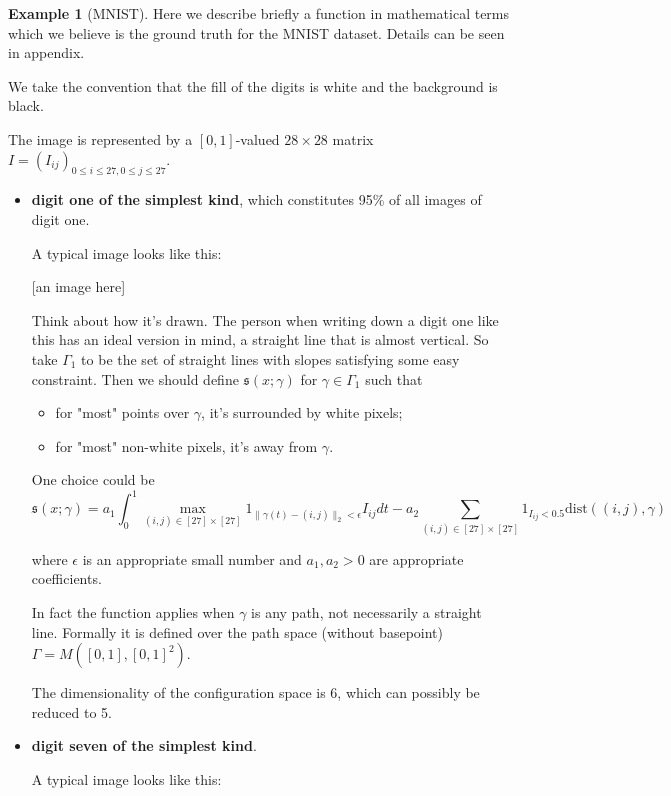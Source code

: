 \documentclass[11pt]{article} 	%
\theoremstyle{definition}
\newtheorem*{example}{Example}
\begin{document}
\begin{example}[MNIST] Here we describe briefly a function in mathematical terms which we believe is the ground truth for the MNIST dataset. Details can be seen in appendix.

We take the convention that the fill of the digits is white and the background is black.

The image is represented by a $[0,1]$-valued $28\times 28$ matrix $I=(I_{ij})_{0\le i\le 27, 0\le j\le 27}$.

\begin{itemize}
	\item \textbf{digit one of the simplest kind}, which constitutes 95\% of all images of digit one.

A typical image looks like this:

[an image here]

Think about how it's drawn. The person when writing down a digit one like this has an ideal version in mind, a straight line that is almost vertical. So take $\Gamma_1$ to be the set of straight lines with slopes satisfying some easy constraint. Then we should define $\mathfrak{s}(x;\gamma)$ for $\gamma\in \Gamma_1$ such that
\begin{itemize}
	\item for "most" points over $\gamma$, it's surrounded by white pixels;
	\item for "most" non-white pixels, it's away from $\gamma$.
\end{itemize}

One choice could be
\begin{equation}
	\mathfrak{s}(x; \gamma)=a_1\int_{0}^1  \max_{(i,j)\in [27]\times[27]}1_{\|\gamma(t) - (i,j)\|_2 < \epsilon} I_{ij}dt
	-
	a_2\sum_{(i,j)\in [27]\times[27]} 1_{I_{ij}< 0.5}\text{dist}((i,j), \gamma)
\end{equation}

where $\epsilon$ is an appropriate small number and $a_1,a_2>0$ are appropriate coefficients.

In fact the function applies when $\gamma$ is any path, not necessarily a straight line. Formally it is defined over the path space (without basepoint) $\Gamma= M([0,1], [0,1]^2)$.

The dimensionality of the configuration space is 6, which can possibly be reduced to 5.

\item \textbf{digit seven of the simplest kind}.

A typical image looks like this:


\end{itemize}
\end{example}
\end{document}
